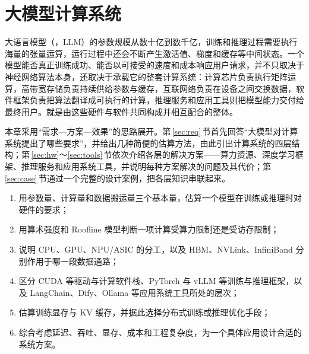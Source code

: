 \chapter{大模型计算系统}
\label{ch:system}

大语言模型（，LLM）的参数规模从数十亿到数千亿，训练和推理过程需要执行海量的张量运算，运行过程中还会不断产生激活值、梯度和缓存等中间状态。一个模型能否真正训练成功、能否以可接受的速度和成本响应用户请求，并不只取决于神经网络算法本身，还取决于承载它的整套计算系统：计算芯片负责执行矩阵运算，高带宽存储负责持续供给参数与缓存，互联网络负责在设备之间交换数据，软件框架负责把算法翻译成可执行的计算，推理服务和应用工具则把模型能力交付给最终用户。就是由这些硬件与软件共同构成并相互配合的整体。

本章采用“需求—方案—效果”的思路展开。第\,\ref{sec:req}\,节首先回答“大模型对计算系统提出了哪些要求”，并给出几种简便的估算方法，由此引出计算系统的四层结构；第\,\ref{sec:hw}～\ref{sec:tools}\,节依次介绍各层的解决方案——算力资源、深度学习框架、推理服务和应用系统工具，并说明每种方案解决的问题及其代价；第\,\ref{sec:case}\,节通过一个完整的设计案例，把各层知识串联起来。

\begin{guide}
\begin{enumerate}[leftmargin=2em]
  \item 用参数量、计算量和数据搬运量三个基本量，估算一个模型在训练或推理时对硬件的要求；
  \item 用算术强度和 Roofline 模型判断一项计算受算力限制还是受访存限制；
  \item 说明 CPU、GPU、NPU/ASIC 的分工，以及 HBM、NVLink、InfiniBand 分别作用于哪一段数据通路；
  \item 区分 CUDA 等驱动与计算软件栈、PyTorch 与 vLLM 等训练与推理框架，以及 LangChain、Dify、Ollama 等应用系统工具所处的层次；
  \item 估算训练显存与 KV 缓存，并据此选择分布式训练或推理优化手段；
  \item 综合考虑延迟、吞吐、显存、成本和工程复杂度，为一个具体应用设计合适的系统方案。
\end{enumerate}
\end{guide}
